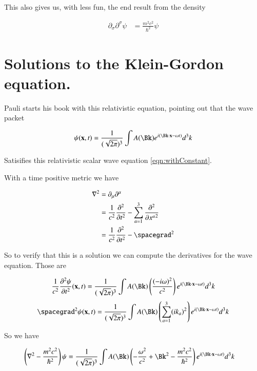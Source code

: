 \documentclass{article}
\newcommand{\PDSq}[2]{\frac{\partial^2 {#2}}{\partial {#1}^2}}
\begin{document}
This also gives us, with less fun, the end result from the density

\begin{align*}
\partial_\sigma \partial^\sigma \psi &= \frac{m^2 c^2}{\hbar^2}\psi 
\end{align*}

\section{ Solutions to the Klein-Gordon equation. }

Pauli starts his book \cite{pauli2000wm} with this relativistic equation, pointing out that the wave packet

\begin{align}
\psi(\Bx,t) = \inv{(\sqrt{2\pi})^3}\int A(\Bk) e^{ i (\Bk \cdot \Bx - \omega t)} d^3 k
\end{align}

Satisifies this relativistic scalar wave equation \ref{eqn:withConstant}.

With a time positive metric
we have

\begin{align*}
\grad^2 
&= \partial_\mu\partial^\mu \\
&= \inv{c^2} \PDSq{t}{} - \sum_{a=1}^3 \PDSq{x^a}{} \\
&= \inv{c^2} \PDSq{t}{} - \spacegrad^2
\end{align*}

So to verify that this is a solution we can compute the derivatives for the wave equation.  Those are

\begin{align*}
\inv{c^2} \PDSq{t} \psi(\Bx,t) = \inv{(\sqrt{2\pi})^3}\int A(\Bk) \left( \frac{(-i\omega)^2}{c^2} \right) e^{ i (\Bk \cdot \Bx - \omega t)} d^3 k
\end{align*}
\begin{align*}
\spacegrad^2 \psi(\Bx,t) = \inv{(\sqrt{2\pi})^3}\int A(\Bk) \left(\sum_{a=1}^3 (i k_a)^2 \right)e^{ i (\Bk \cdot \Bx - \omega t)} d^3 k
\end{align*}

So we have

\begin{align*}
\left( \grad^2 - \frac{m^2 c^2}{\hbar^2} \right) \psi 
&=
\inv{(\sqrt{2\pi})^3}\int A(\Bk) \left( -\frac{\omega^2}{c^2} + \Bk^2 - \frac{m^2 c^2}{\hbar^2}
\right)e^{ i (\Bk \cdot \Bx - \omega t)} d^3 k
\end{align*}
\end{document}
